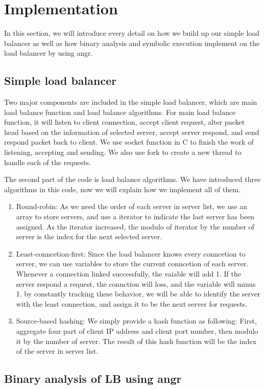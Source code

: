 \section{Implementation}

In this section, we will introduce every detail on how we build up our simple
load balancer as well as how binary analysis and symbolic execution implement on
the load balancer by using angr.


\subsection{Simple load balancer}
Two major components are included in the simple load balancer, which are main
load balance function and load balance algorithms.  For main load balance
function, it will \ca listen to client connection, \cb accept client request,
\cc alter packet head based on the information of selected server, \cd accept
server respond, and \ce send respond packet back to client.  We use socket
function in C to finish the work of listening, accepting and sending.  We also
use fork to create a new thread to handle each of the requests.

The second part of the code is load balance algorithms.  We have introduced
three algorithms in this code, now we will explain how we implement all of them.
\begin{enumerate}
    \item Round-robin: As we need the order of each server in server list, we
        use an array to store servers, and use a iterator to indicate the last
        server has been assigned. As the iterator increased, the modulo of
        iterator by the number of server is the index for the next selected
        server.
    \item Least-conncetion-first: Since the load balancer knows every conncetion
        to server, we can use variables to store the current conncetion of each
        server. Whenever a connection linked successfully, the vaiable will add
        1. If the server respond a request, the connction will loss, and the
        variable will minus 1. by constantly tracking these behavior, we will be
        able to identify the server with the least connection, and assign it to
        be the next server for requests.
    \item Source-based hashing: We simply provide a hash function as following:
        First, aggregate four part of client IP address and client port number,
        then modulo it by the number of server. The result of this hash function
        will be the index of the server in server list.
\end{enumerate}


\subsection{Binary analysis of LB using angr}



